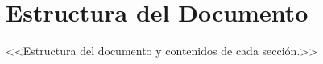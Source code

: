 
\section{Estructura del Documento} \label{sct:intro_estructura}

<<Estructura del documento y contenidos de cada sección.>>

